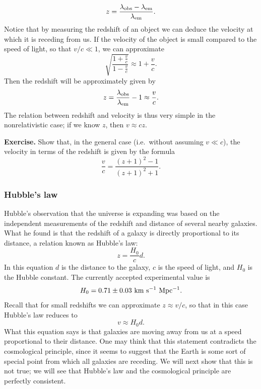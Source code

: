 \begin{equation}
z=\frac{\lambda_{\rm obs}-\lambda_{\rm em}}{\lambda_{\rm em}}.
\end{equation}
Notice that by measuring the redshift of an object we can deduce the velocity at which it is receding from us. If the velocity of the object is small compared to the speed of light, so that $v/c\ll1$, we can approximate
\begin{equation}
\sqrt{\frac{1+\frac{v}{c}}{1-\frac{v}{c}}}\approx 1+\frac{v}{c}.
\end{equation}
Then the redshift will be approximately given by
\begin{equation}
z=\frac{\lambda_{\rm obs}}{\lambda_{\rm em}}-1\approx \frac{v}{c}.
\end{equation}
The relation between redshift and velocity is thus very simple in the nonrelativistic case; if we know $z$, then $v\approx cz$.

\par\vspace{\baselineskip}

{\bf Exercise.} Show that, in the general case (i.e.\ without assuming $v\ll c$), the velocity in terms of the redshift is given by the formula
\begin{equation}
\frac{v}{c}=\frac{(z+1)^2-1}{(z+1)^2+1}.
\end{equation}

\par\vspace{\baselineskip}

\subsubsection{Hubble's law}

Hubble's observation that the universe is expanding was based on the independent measurements of the redshift and distance of several nearby galaxies. What he found is that the redshift of a galaxy is directly proportional to its distance, a relation known as Hubble's law:
\begin{equation}
z=\frac{H_0}{c}d.
\end{equation}
In this equation $d$ is the distance to the galaxy, $c$ is the speed of light, and $H_0$ is the Hubble constant. The currently accepted experimental value is
\begin{equation}
H_0=0.71\pm 0.03~{\rm km~s^{-1}~Mpc^{-1}}.
\end{equation}
Recall that for small redshifts we can approximate $z\approx v/c$, so that in this case Hubble's law reduces to
\begin{equation}
v\approx H_0 d.
\end{equation}
What this equation says is that galaxies are moving away from us at a speed proportional to their distance. One may think that this statement contradicts the cosmological principle, since it seems to suggest that the Earth is some sort of special point from which all galaxies are receding. We will next show that this is not true; we will see that Hubble's law and the cosmological principle are perfectly consistent.


